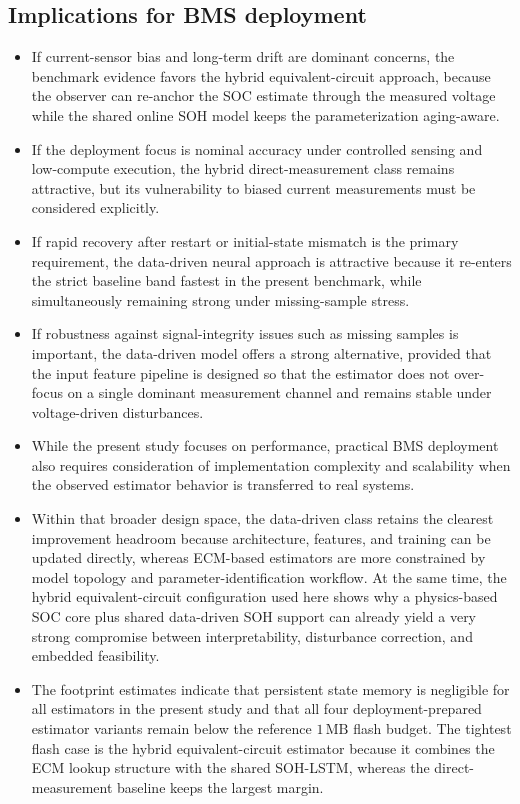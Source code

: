 \documentclass[review]{elsarticle}
\begin{document}
\subsection{Implications for BMS deployment}
\begin{itemize}[leftmargin=*]
    \item If current-sensor bias and long-term drift are dominant concerns, the benchmark evidence favors the hybrid equivalent-circuit approach, because the observer can re-anchor the SOC estimate through the measured voltage while the shared online SOH model keeps the parameterization aging-aware.
    \item If the deployment focus is nominal accuracy under controlled sensing and low-compute execution, the hybrid direct-measurement class remains attractive, but its vulnerability to biased current measurements must be considered explicitly.
    \item If rapid recovery after restart or initial-state mismatch is the primary requirement, the data-driven neural approach is attractive because it re-enters the strict baseline band fastest in the present benchmark, while simultaneously remaining strong under missing-sample stress.
    \item If robustness against signal-integrity issues such as missing samples is important, the data-driven model offers a strong alternative, provided that the input feature pipeline is designed so that the estimator does not over-focus on a single dominant measurement channel and remains stable under voltage-driven disturbances.
    \item While the present study focuses on performance, practical BMS deployment also requires consideration of implementation complexity and scalability when the observed estimator behavior is transferred to real systems.
    \item Within that broader design space, the data-driven class retains the clearest improvement headroom because architecture, features, and training can be updated directly, whereas ECM-based estimators are more constrained by model topology and parameter-identification workflow. At the same time, the hybrid equivalent-circuit configuration used here shows why a physics-based SOC core plus shared data-driven SOH support can already yield a very strong compromise between interpretability, disturbance correction, and embedded feasibility.
    \item The footprint estimates indicate that persistent state memory is negligible for all estimators in the present study and that all four deployment-prepared estimator variants remain below the reference $1\,\mathrm{MB}$ flash budget. The tightest flash case is the hybrid equivalent-circuit estimator because it combines the ECM lookup structure with the shared SOH-LSTM, whereas the direct-measurement baseline keeps the largest margin.

\end{itemize}
\end{document}
